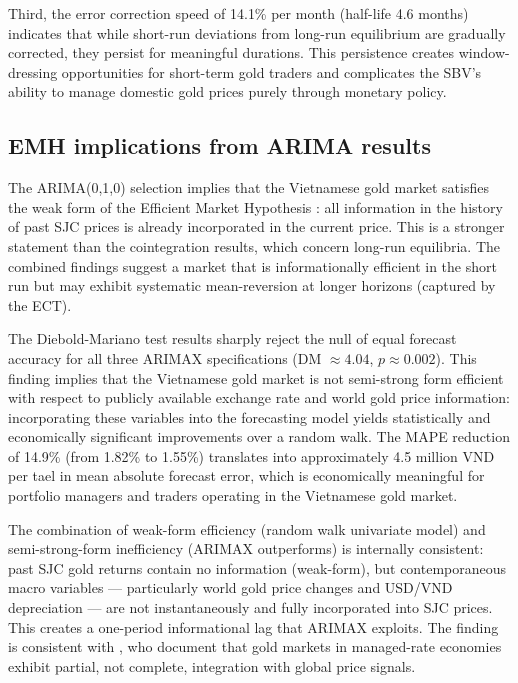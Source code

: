 \documentclass[12pt,a4paper]{article}
\begin{document}
Third, the error correction speed of 14.1\% per month (half-life 4.6 months)
indicates that while short-run deviations from long-run equilibrium are
gradually corrected, they persist for meaningful durations. This
persistence creates window-dressing opportunities for short-term gold
traders and complicates the SBV's ability to manage domestic gold prices
purely through monetary policy.

\subsection{EMH implications from ARIMA results}

The ARIMA(0,1,0) selection implies that the Vietnamese gold market satisfies
the weak form of the Efficient Market Hypothesis \citep{fama1970}: all
information in the history of past SJC prices is already incorporated
in the current price. This is a stronger statement than the cointegration
results, which concern long-run equilibria. The combined findings suggest
a market that is informationally efficient in the short run but may exhibit
systematic mean-reversion at longer horizons (captured by the ECT).

The Diebold-Mariano test results sharply reject the null of equal forecast
accuracy for all three ARIMAX specifications (DM $\approx 4.04$,
$p \approx 0.002$). This finding implies that the Vietnamese gold market
is not semi-strong form efficient with respect to publicly available
exchange rate and world gold price information: incorporating these
variables into the forecasting model yields statistically and economically
significant improvements over a random walk. The MAPE reduction of 14.9\%
(from 1.82\% to 1.55\%) translates into approximately 4.5 million VND
per tael in mean absolute forecast error, which is economically meaningful
for portfolio managers and traders operating in the Vietnamese gold market.

The combination of weak-form efficiency (random walk univariate model) and
semi-strong-form inefficiency (ARIMAX outperforms) is internally consistent:
past SJC gold returns contain no information (weak-form), but contemporaneous
macro variables --- particularly world gold price changes and USD/VND
depreciation --- are not instantaneously and fully incorporated into SJC
prices. This creates a one-period informational lag that ARIMAX exploits.
The finding is consistent with \citet{wang2021}, who document that gold
markets in managed-rate economies exhibit partial, not complete, integration
with global price signals.
\end{document}

